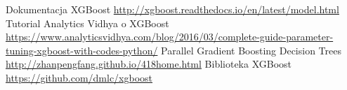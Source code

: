 \documentclass[a4paper,12p]{article}
\begin{document}

\begin{thebibliography}{1}
 Dokumentacja XGBoost \url{http://xgboost.readthedocs.io/en/latest/model.html}
 Tutorial Analytics Vidhya o XGBoost \url{https://www.analyticsvidhya.com/blog/2016/03/complete-guide-parameter-tuning-xgboost-with-codes-python/}
 Parallel Gradient Boosting Decision Trees \url{http://zhanpengfang.github.io/418home.html}
 Biblioteka XGBoost \url{https://github.com/dmlc/xgboost}
\end{thebibliography}
\end{document}
